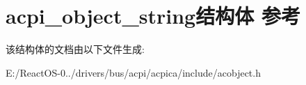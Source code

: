 \hypertarget{structacpi__object__string}{}\section{acpi\+\_\+object\+\_\+string结构体 参考}
\label{structacpi__object__string}


该结构体的文档由以下文件生成\+:\begin{DoxyCompactItemize}
\item 
E\+:/\+React\+O\+S-\/0../drivers/bus/acpi/acpica/include/acobject.\+h\end{DoxyCompactItemize}
